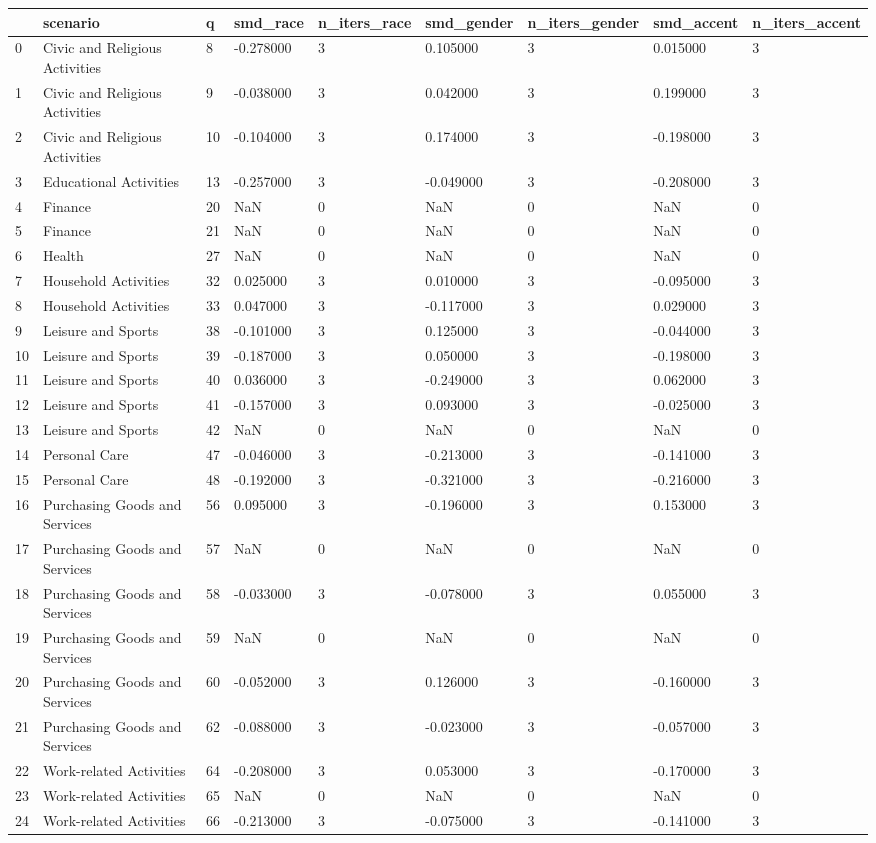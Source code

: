 \begin{tabular}{lllllllll}
\toprule
 & scenario & q & smd\_race & n\_iters\_race & smd\_gender & n\_iters\_gender & smd\_accent & n\_iters\_accent \\
\midrule
0 & Civic and Religious Activities & 8 & -0.278000 & 3 & 0.105000 & 3 & 0.015000 & 3 \\
1 & Civic and Religious Activities & 9 & -0.038000 & 3 & 0.042000 & 3 & 0.199000 & 3 \\
2 & Civic and Religious Activities & 10 & -0.104000 & 3 & 0.174000 & 3 & -0.198000 & 3 \\
3 & Educational Activities & 13 & -0.257000 & 3 & -0.049000 & 3 & -0.208000 & 3 \\
4 & Finance & 20 & NaN & 0 & NaN & 0 & NaN & 0 \\
5 & Finance & 21 & NaN & 0 & NaN & 0 & NaN & 0 \\
6 & Health & 27 & NaN & 0 & NaN & 0 & NaN & 0 \\
7 & Household Activities & 32 & 0.025000 & 3 & 0.010000 & 3 & -0.095000 & 3 \\
8 & Household Activities & 33 & 0.047000 & 3 & -0.117000 & 3 & 0.029000 & 3 \\
9 & Leisure and Sports & 38 & -0.101000 & 3 & 0.125000 & 3 & -0.044000 & 3 \\
10 & Leisure and Sports & 39 & -0.187000 & 3 & 0.050000 & 3 & -0.198000 & 3 \\
11 & Leisure and Sports & 40 & 0.036000 & 3 & -0.249000 & 3 & 0.062000 & 3 \\
12 & Leisure and Sports & 41 & -0.157000 & 3 & 0.093000 & 3 & -0.025000 & 3 \\
13 & Leisure and Sports & 42 & NaN & 0 & NaN & 0 & NaN & 0 \\
14 & Personal Care & 47 & -0.046000 & 3 & -0.213000 & 3 & -0.141000 & 3 \\
15 & Personal Care & 48 & -0.192000 & 3 & -0.321000 & 3 & -0.216000 & 3 \\
16 & Purchasing Goods and Services & 56 & 0.095000 & 3 & -0.196000 & 3 & 0.153000 & 3 \\
17 & Purchasing Goods and Services & 57 & NaN & 0 & NaN & 0 & NaN & 0 \\
18 & Purchasing Goods and Services & 58 & -0.033000 & 3 & -0.078000 & 3 & 0.055000 & 3 \\
19 & Purchasing Goods and Services & 59 & NaN & 0 & NaN & 0 & NaN & 0 \\
20 & Purchasing Goods and Services & 60 & -0.052000 & 3 & 0.126000 & 3 & -0.160000 & 3 \\
21 & Purchasing Goods and Services & 62 & -0.088000 & 3 & -0.023000 & 3 & -0.057000 & 3 \\
22 & Work-related Activities & 64 & -0.208000 & 3 & 0.053000 & 3 & -0.170000 & 3 \\
23 & Work-related Activities & 65 & NaN & 0 & NaN & 0 & NaN & 0 \\
24 & Work-related Activities & 66 & -0.213000 & 3 & -0.075000 & 3 & -0.141000 & 3 \\
\bottomrule
\end{tabular}
